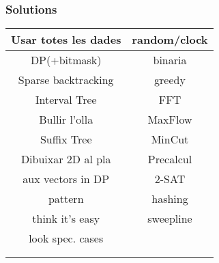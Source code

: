 \subsubsection{Solutions}
\begin{tabular}{|c|c|}
    \hline
    Usar totes les dades & random/clock \\
    \hline
    DP(+bitmask) & binaria \\
    \hline
    Sparse backtracking & greedy \\
    \hline
    Interval Tree& FFT \\
    \hline
    Bullir l'olla & MaxFlow \\
    \hline
    Suffix Tree& MinCut \\
    \hline
    Dibuixar 2D al pla & Precalcul \\
    \hline
    aux vectors in DP& 2-SAT \\
    \hline
    pattern & hashing \\
    \hline
    think it's easy & sweepline\\
    \hline
    look spec. cases & \\
    \hline
    & \\
    \hline
    & \\
    \hline
\end{tabular}
